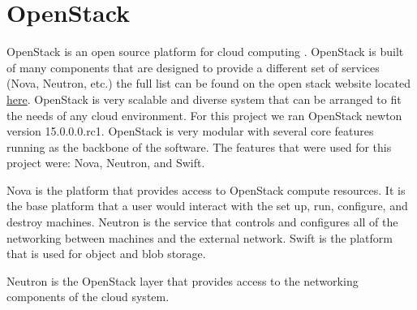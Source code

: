 \documentclass[12pt]{article}
\begin{document}
\section{OpenStack}
OpenStack is an open source platform for cloud computing \cite{wiki:OpenStack}. OpenStack is built of many components that are designed to provide a different set of services (Nova, Neutron, etc.) the full list can be found on the open stack website located \href{https://www.openstack.org/software/project-navigator/}{here}. OpenStack is very scalable and diverse system that can be arranged to fit the needs of any cloud environment. For this project we ran OpenStack newton version 15.0.0.0.rc1. OpenStack is very modular with several core features running as the backbone of the software. The features that were used for this project were: Nova, Neutron, and Swift.

Nova is the platform that provides access to OpenStack compute resources. It is the base platform that a user would interact with the set up, run, configure, and destroy machines. Neutron is the service that controls and configures all of the networking between machines and the external network. Swift is the platform that is used for object and blob storage.

Neutron is the OpenStack layer that provides access to the networking components of the cloud system.

\end{document}
